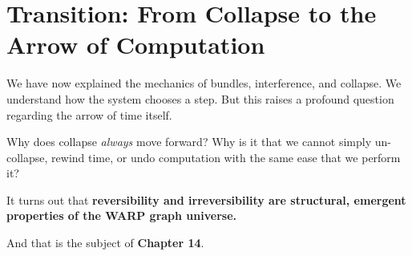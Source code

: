 \section{\texorpdfstring{\textbf{Transition: From Collapse to the Arrow of Computation}}{13.11 --- Transition: From Collapse to the Arrow of Computation}}

We have now explained the mechanics of bundles, interference, and collapse. We understand how the system chooses a step. But this raises a profound question regarding the arrow of time itself.

Why does collapse \emph{always} move forward? Why is it that we cannot simply un-collapse, rewind time, or undo computation with the same ease that we perform it?

It turns out that \textbf{reversibility and irreversibility are structural, emergent properties of the WARP graph universe.}

And that is the subject of \textbf{Chapter 14}.
